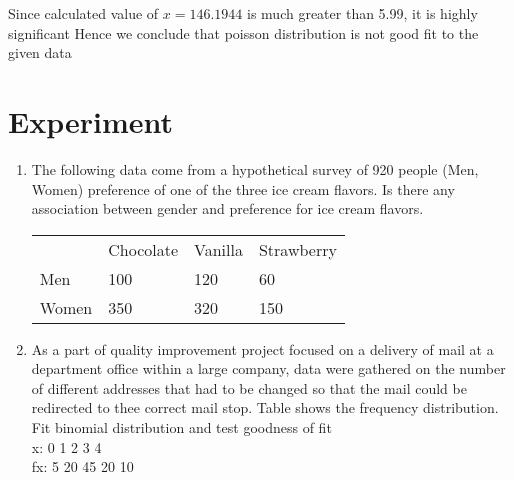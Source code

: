 \documentclass{article}\usepackage[]{graphicx}\usepackage[]{xcolor}
\begin{document}
Since calculated value of $x=146.1944$ is much greater than 5.99, it is highly significant
Hence we conclude that poisson distribution is not good fit to the given data
\section*{Experiment}
\begin{enumerate}
  \item 
The following data come from a hypothetical survey of 920 people (Men, Women) preference of one of the three ice cream flavors. Is there any association between gender and preference for ice
cream flavors.
\begin{table}[h]
\begin{tabular}{llll}
      & Chocolate & Vanilla & Strawberry \\
Men   & 100       & 120     & 60         \\
Women & 350       & 320     & 150       
\end{tabular}
\end{table}
\item As a part of quality improvement project focused on a delivery of mail at a department office within a large company, data were gathered on the number of different addresses that had to be changed so that the mail could be redirected to thee correct mail stop. Table shows the frequency distribution. Fit binomial distribution and test goodness of fit\\
x:
0 1
2
3
4\\
fx: 5 20
45 20 10
\end{enumerate}
\end{document}
